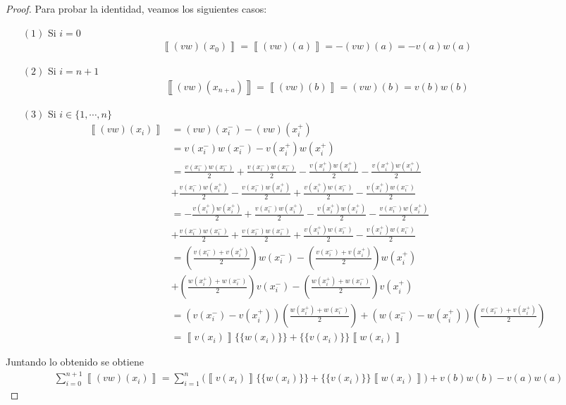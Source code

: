 \documentclass[10pt,a4paper]{report}
\providecommand{\salto}[1]{\left\llbracket#1\right\rrbracket}
\providecommand{\prom}[1]{\{\!\{#1\}\!\}}
\begin{document}
    \begin{proof}
    	Para probar la identidad, veamos los siguientes casos:
    	\begin{itemize}
    		\item[$(1)$] Si $i = 0$
    		\begin{align*}
    			\salto{(vw)(x_{0})} = \salto{(vw)(a)} = -(vw)(a) = -v(a)w(a)
    		\end{align*}
    	    \item[$(2)$] Si $i = n+1$
    	    \begin{align*}
    	    	\salto{(vw)(x_{n+a})} = \salto{(vw)(b)} = (vw)(b) = v(b)w(b)
    	    \end{align*}
    	    \item[$(3)$] Si $i\in \{1,\cdots,n\}$
    	    \begin{align*}
    	    	\salto{(vw)(x_{i})} &= (vw)(x^{-}_{i}) - (vw)(x^{+}_{i})\\
    	    	&= v(x^{-}_{i})w(x^{-}_{i}) - v(x^{+}_{i})w(x^{+}_{i}) \\
    	    	&= \frac{v(x^{-}_{i})w(x^{-}_{i})}{2} + \frac{v(x^{-}_{i})w(x^{-}_{i})}{2} - \frac{v(x^{+}_{i})w(x^{+}_{i})}{2} - \frac{v(x^{+}_{i})w(x^{+}_{i})}{2}\\ &+ \frac{v(x^{-}_{i})w(x^{+}_{i})}{2} - \frac{v(x^{-}_{i})w(x^{+}_{i})}{2} + \frac{v(x^{+}_{i})w(x^{-}_{i})}{2} - 
    	    	\frac{v(x^{+}_{i})w(x^{-}_{i})}{2}\\
    	    	&= -\frac{v(x^{+}_{i})w(x^{+}_{i})}{2} + \frac{v(x^{-}_{i})w(x^{+}_{i})}{2} - \frac{v(x^{+}_{i})w(x^{+}_{i})}{2} - \frac{v(x^{-}_{i})w(x^{+}_{i})}{2}\\ 
    	    	&+ \frac{v(x^{-}_{i})w(x^{-}_{i})}{2} + \frac{v(x^{-}_{i})w(x^{-}_{i})}{2} +
    	    	\frac{v(x^{+}_{i})w(x^{-}_{i})}{2} - 
    	    	\frac{v(x^{+}_{i})w(x^{-}_{i})}{2}\\
    	    	&= \left( \frac{v(x^{-}_{i}) + v(x^{+}_{i})}{2}\right)w(x^{-}_{i}) -  \left( \frac{v(x^{-}_{i}) + v(x^{+}_{i})}{2}\right)w(x^{+}_{i})\\
    	    	&+ \left(\frac{w(x^{+}_{i}) + w(x^{-}_{i}) }{2}\right)v(x^{-}_{i}) - \left(\frac{w(x^{+}_{i}) + w(x^{-}_{i})}{2}\right)v(x^{+}_{i})\\
    	    	&= \left(v(x^{-}_{i}) - v(x^{+}_{i})\right)\left(\frac{w(x^{+}_{i}) + w(x^{-}_{i}) }{2}\right) + \left(w(x^{-}_{i}) - w(x^{+}_{i})\right)\left( \frac{v(x^{-}_{i})+v(x^{+}_{i})}{2}\right)\\
    	    	&= \salto{v(x_{i})}\prom{w(x_{i})} + \prom{v(x_{i})}\salto{w(x_{i})}
    	    \end{align*}
    	\end{itemize}
    Juntando lo obtenido se obtiene 
    \begin{align*}
    	\sum_{i=0}^{n+1} \salto{(vw)(x_{i})} = \sum_{i=1}^{n}\Big( \salto{v(x_{i})}\prom{w(x_{i})} + \prom{v(x_{i})}\salto{w(x_{i})}\Big) + v(b)w(b) - v(a)w(a)
    \end{align*}
    \end{proof}
\end{document}
